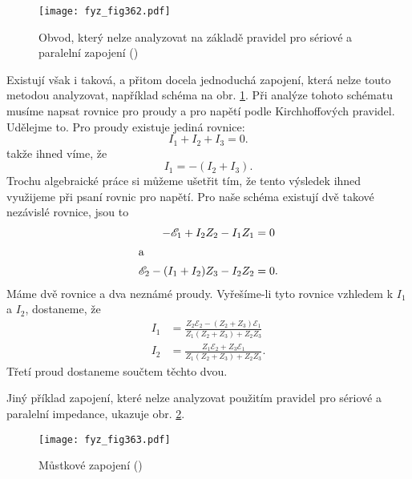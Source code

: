 {  \begin{figure}[ht!] %
    \centering
    \texttt{[image: fyz\_fig362.pdf]}
    \caption{Obvod, který nelze analyzovat na základě pravidel pro sériové a paralelní zapojení
             (\cite[s.~403]{Feynman02})}
    \label{fyz:fig362}
  \end{figure}
   
  Existují však i taková, a přitom docela jednoduchá zapojení, která nelze touto metodou 
  analyzovat, například schéma na obr. \ref{fyz:fig362}. Při analýze tohoto schématu musíme napsat 
  rovnice pro proudy a pro napětí podle Kirchhoffových pravidel. Udělejme to. Pro proudy existuje 
  jediná rovnice:
  \begin{equation*}
    I_1 + I_2 + I_3 = 0.
  \end{equation*}
  takže ihned víme, že
  \begin{equation*}
    I_1 = - (I_2 + I_3).
  \end{equation*}
  Trochu algebraické práce si můžeme ušetřit tím, že tento výsledek ihned využijeme při psaní 
  rovnic pro napětí. Pro naše schéma existují dvě takové nezávislé rovnice, jsou to
  \begin{align*}
   -\mathscr{E}_1 + I_2Z_2 - I_1Z_1         &= 0 \\
   \shortintertext{a}
    \mathscr{E}_2 - (I_1 + I_2)Z_3 - I_2Z_2 &= 0.
  \end{align*}
  Máme dvě rovnice a dva neznámé proudy. Vyřešíme-li tyto rovnice vzhledem k \(I_1\) a \(I_2\), 
  dostaneme,  že 
  \begin{subequations}\label{fyz:eq491}
    \begin{align}
      I_1 &=\frac{Z_2\mathscr{E}_2-(Z_2+Z_3)\mathscr{E}_1}{Z_1(Z_2+Z_3)+Z_2Z_3}\label{fyz:eq491a} \\
      I_2 &=\frac{Z_1\mathscr{E}_2+Z_3\mathscr{E}_1}{Z_1(Z_2+Z_3)+Z_2Z_3}.     \label{fyz:eq491b}
    \end{align}
  \end{subequations}
  Třetí proud dostaneme součtem těchto dvou.
  
  Jiný příklad zapojení, které nelze analyzovat použitím pravidel pro sériové a paralelní 
  impedance, ukazuje obr. \ref{fyz:fig363}.
  
  
  \begin{figure}[ht!] %
    \centering
    \texttt{[image: fyz\_fig363.pdf]}
    \caption{Můstkové zapojení
             (\cite[s.~403]{Feynman02})}
    \label{fyz:fig363}
  \end{figure}
  
}
